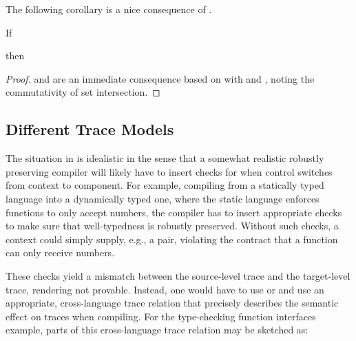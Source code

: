 The following corollary is a nice consequence of .
\begin{corollary}[\Coqed]{}
  If 
  \begin{assumptions}
  \end{assumptions}
  then
  \begin{goals}
  \end{goals}
\end{corollary}
\begin{proof}
   and  are an immediate consequence based on  with  and , noting the commutativity of set intersection.
\end{proof}

\subsection{Different Trace Models}\label{subsec:rtpc-different-trace-models}

The situation in  is idealistic in the sense that a somewhat realistic robustly preserving compiler will likely have to insert checks for when control switches from context to component.
For example, compiling from a statically typed language into a dynamically typed one, where the static language enforces functions to only accept numbers, the compiler has to insert appropriate checks to make sure that well-typedness is robustly preserved.
Without such checks, a context could simply supply, e.g., a pair, violating the contract that a function can only receive numbers.

These checks yield a mismatch between the source-level trace and the target-level trace, rendering  not provable.
Instead, one would have to use  or  and use an appropriate, cross-language trace relation that precisely describes the semantic effect on traces when compiling.
For the type-checking function interfaces example, parts of this cross-language trace relation may be sketched as:

